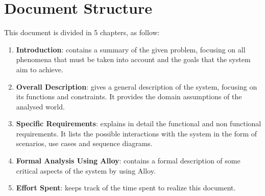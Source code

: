 \section{Document Structure}
This document is divided in 5 chapters, as follow:
\begin{enumerate}
	\item \textbf{Introduction}: contains a summary of the given problem, focusing on all phenomena that must be taken into account and the goals that the system aim to achieve.

	\item \textbf{Overall Description}: gives a general description of the system, focusing on its functions and constraints. It provides the domain assumptions of the analysed world.

	\item \textbf{Specific Requirements}: explains in detail the functional and non functional requirements. It lists the possible interactions with the system in the form of scenarios, use cases and sequence diagrams.

	\item \textbf{Formal Analysis Using Alloy}: contains a formal description of some critical aspects of the system by using Alloy.

	\item \textbf{Effort Spent}: keeps track of the time spent to realize this document.
\end{enumerate}